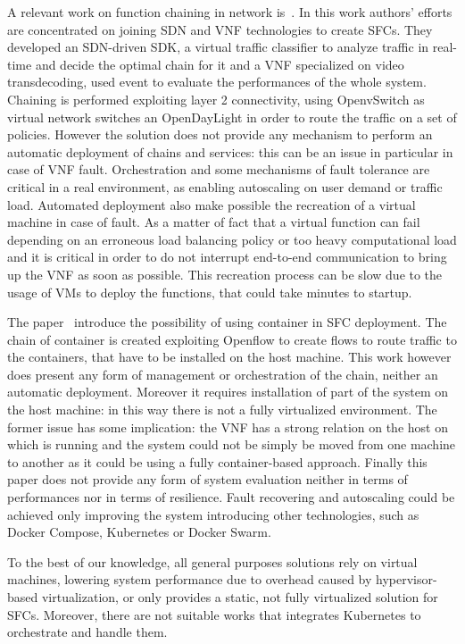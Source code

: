 A relevant work on function chaining in network is~\cite{trajkovska2017sdn}. In
this work authors' efforts are concentrated on joining SDN and VNF technologies
to create SFCs. They developed an SDN-driven SDK, a virtual traffic classifier
to analyze traffic in real-time and decide the optimal chain for it and a VNF
specialized on video transdecoding, used event to evaluate the performances of
the whole system. Chaining is performed exploiting layer 2 connectivity, using
OpenvSwitch as virtual network switches an OpenDayLight in order to route the
traffic on a set of policies. However the solution does not provide any
mechanism to perform an automatic deployment of chains and services: this can be
an issue in particular in case of VNF fault. Orchestration and some mechanisms
of fault tolerance are critical in a real environment, as enabling
autoscaling on user demand or traffic load. Automated deployment also make
possible the recreation of a virtual machine in case of fault. As a matter of
fact that a virtual function can fail depending on an erroneous load balancing
policy or too heavy computational load and it is critical in order to do not
interrupt end-to-end communication to bring up the VNF as soon as possible. This
recreation process can be slow due to the usage of VMs to deploy the functions,
that could take minutes to startup.

The paper~\cite{kriti2017dnfc} introduce the possibility of using container in
SFC deployment. The chain of container is created exploiting Openflow to create
flows to route traffic to the containers, that have to be installed on the host
machine. This work however does present any form of management or orchestration
of the chain, neither an automatic deployment. Moreover it requires installation
of part of the system on the host machine: in this way there is not a fully
virtualized environment. The former issue has some implication: the VNF has a
strong relation on the host on which is running and the system could not be
simply be moved from one machine to another as it could be using a fully
container-based approach. Finally this paper does not provide any form of system
evaluation neither in terms of performances nor in terms of resilience. Fault
recovering and autoscaling could be achieved only improving the system
introducing other technologies, such as Docker Compose, Kubernetes or Docker
Swarm.

To the best of our knowledge, all general purposes solutions rely on virtual
machines, lowering system performance due to overhead caused by hypervisor-based
virtualization, or only provides a static, not fully virtualized solution for
SFCs. Moreover, there are not suitable works that integrates Kubernetes to
orchestrate and handle them.

